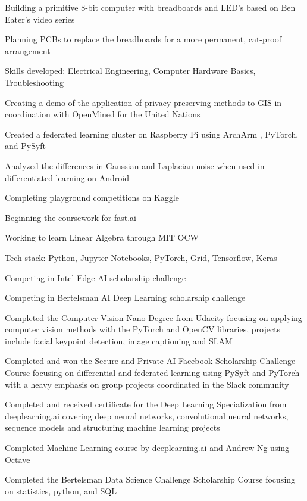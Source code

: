 \documentclass[letterpaper]{resume}
\begin{document}
\begin{compactitem}
\item Building a primitive 8-bit computer with breadboards and LED's based on Ben Eater's video series
\item Planning PCBs to replace the breadboards for a more permanent, cat-proof arrangement
\item Skills developed: Electrical Engineering, Computer Hardware Basics, Troubleshooting
\end{compactitem}

\begin{compactitem}
\item Creating a demo of the application of privacy preserving methods to GIS in coordination with OpenMined for the United Nations
\item Created a federated learning cluster on Raspberry Pi using ArchArm , PyTorch, and PySyft
\item Analyzed the differences in Gaussian and Laplacian noise when used in differentiated learning on Android%
\item Completing playground competitions on Kaggle
\item Beginning the coursework for fast.ai
\item Working to learn Linear Algebra through MIT OCW
\item Tech stack: Python, Jupyter Notebooks, PyTorch, Grid, Tensorflow, Keras
\end{compactitem}

\begin{compactitem}
\item Competing in Intel Edge AI scholarship challenge
\item Competing in Bertelsman AI Deep Learning scholarship challenge
\item Completed the Computer Vision Nano Degree from Udacity focusing on applying computer vision methods with the PyTorch and OpenCV libraries, projects include facial keypoint detection, image captioning and SLAM
\item Completed and won the Secure and Private AI Facebook Scholarship Challenge Course focusing on differential and federated learning using PySyft and PyTorch with a heavy emphasis on group projects coordinated in the Slack community
\item Completed and received certificate for the Deep Learning Specialization from deeplearning.ai covering deep neural networks, convolutional neural networks, sequence models and structuring machine learning projects
\item Completed Machine Learning course by deeplearning.ai and Andrew Ng using Octave
\item Completed the Bertelsman Data Science Challenge Scholarship Course focusing on statistics, python, and SQL
\end{compactitem}
\end{document}
